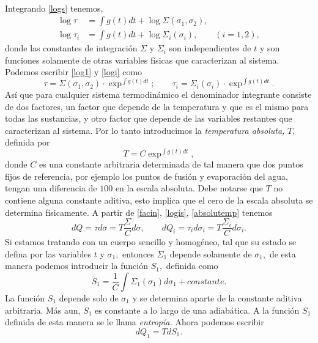 \documentclass{article}
\theoremstyle{definition} \newtheorem{defi}{Definici\'on}
\theoremstyle{definition} \newtheorem{teo}{Teorema}
\theoremstyle{definition} \newtheorem{cor}{Corolario}
\begin{document}
\paragraph{}
Integrando \eqref{logs} tenemos,
\begin{align}
\log \tau &= \int g(t)dt + \log \Sigma (\sigma_1,\sigma_2)\label{log1},\\ 
\log \tau_i &= \int g(t)dt + \log \Sigma_i (\sigma_i), \qquad (i=1,2)\label{logi},
\end{align}
donde las constantes de integraci\'on $\Sigma$ y $\Sigma_i$ son independientes de $t$ y son funciones solamente de otras variables f\'isicas que caracterizan al sistema. Podemos escribir \eqref{log1} y \eqref{logi} como
\begin{equation}\label{logis}
\tau = \Sigma(\sigma_1,\sigma_2) \cdot \exp^{\int g(t)dt}; \qquad \tau_i = \Sigma_i(\sigma_i) \cdot \exp^{\int g(t)dt}. 
\end{equation}
As\'i que para cualquier sistema termodin\'amico el denominador integrante consiste de dos factores, un factor que depende de la temperatura y que es el mismo para todas las sustancias, y otro factor que depende de las variables restantes que caracterizan al sistema. Por lo tanto introducimos la \emph{temperatura absoluta,} $T,$ definida por
\begin{equation}\label{absolutemp}
T=C\exp^{\int g(t)dt},
\end{equation}
donde $C$ es una constante arbitraria determinada de tal manera que dos puntos fijos de referencia, por ejemplo los puntos de fusi\'on y evaporaci\'on del agua, tengan una diferencia de $100$ en la escala absoluta. Debe notarse que $T$ no contiene alguna constante aditiva, esto implica que el cero de la escala absoluta se determina f\'isicamente. A partir de \eqref{facin}, \eqref{logis}, \eqref{absolutemp} tenemos
\begin{equation}
dQ = \tau d\sigma = T \frac{\Sigma}{C}d\sigma, \qquad dQ_i = \tau_i d\sigma_i = T \frac{\Sigma_i}{C}d\sigma_i.
\end{equation}
Si estamos tratando con un cuerpo sencillo y homog\'eneo, tal que su estado se defina por las variables $t$ y $\sigma_1,$ entonces $\Sigma_1$ depende solamente de $\sigma_1,$ de esta manera podemos introducir la funci\'on $S_1,$ definida como
\begin{equation}
S_1 = \frac{1}{C}\int \Sigma_1(\sigma_1)d\sigma_1 + constante.
\end{equation}
La funci\'on $S_1$ depende solo de $\sigma_1$ y se determina aparte de la constante aditiva arbitraria. M\'as aun, $S_1$ es constante a lo largo de una adiab\'atica. A la funci\'on $S_1$ definida de esta manera se le llama \emph{entrop\'ia.} Ahora podemos escribir
\begin{equation}
dQ_1 = TdS_1.
\end{equation}
\end{document}

